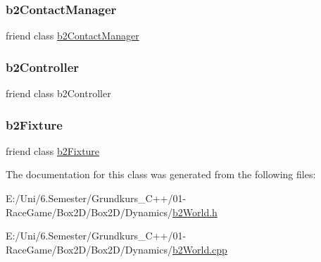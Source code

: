 \mbox{\label{classb2_world_aece264d42f69aed410f5eb3beba6ddf2}} 
\subsubsection{\texorpdfstring{b2ContactManager}{b2ContactManager}}
{\footnotesize\ttfamily friend class \mbox{\hyperlink{classb2_contact_manager}{b2\+Contact\+Manager}}\hspace{0.3cm}{\ttfamily [friend]}}

\mbox{\label{classb2_world_ad0171f9dac44cc7aae065c618c0d165b}} 
\subsubsection{\texorpdfstring{b2Controller}{b2Controller}}
{\footnotesize\ttfamily friend class b2\+Controller\hspace{0.3cm}{\ttfamily [friend]}}

\mbox{\label{classb2_world_afb35b0e61f6ee3cc516c40ea251f3236}} 
\subsubsection{\texorpdfstring{b2Fixture}{b2Fixture}}
{\footnotesize\ttfamily friend class \mbox{\hyperlink{classb2_fixture}{b2\+Fixture}}\hspace{0.3cm}{\ttfamily [friend]}}



The documentation for this class was generated from the following files\+:\begin{DoxyCompactItemize}
\item 
E\+:/\+Uni/6.\+Semester/\+Grundkurs\+\_\+\+C++/01-\/\+Race\+Game/\+Box2\+D/\+Box2\+D/\+Dynamics/\mbox{\hyperlink{b2_world_8h}{b2\+World.\+h}}\item 
E\+:/\+Uni/6.\+Semester/\+Grundkurs\+\_\+\+C++/01-\/\+Race\+Game/\+Box2\+D/\+Box2\+D/\+Dynamics/\mbox{\hyperlink{b2_world_8cpp}{b2\+World.\+cpp}}\end{DoxyCompactItemize}
